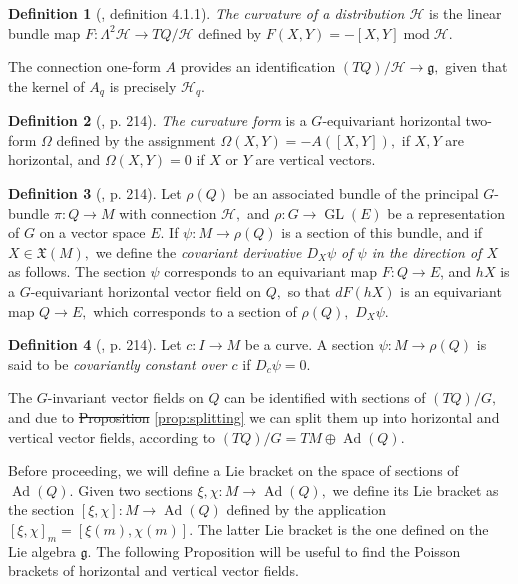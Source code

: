 \documentclass[12pt, letterpaper, reqno]{amsart}
\theoremstyle{definition}
\newtheorem{df}{Definition}
\theoremstyle{plain}
\theoremstyle{remark}
\providecommand{\DIFadd}[1]{{\protect\color{blue}\uwave{#1}}} %
\providecommand{\DIFdel}[1]{{\protect\color{red}\sout{#1}}}                      %
\providecommand{\DIFaddbegin}{} %
\providecommand{\DIFaddend}{} %
\providecommand{\DIFdelbegin}{} %
\providecommand{\DIFdelend}{} %
\newcommand{\DIFscaledelfig}{0.5}
\newlength{\DIFdelgraphicswidth} %
\newlength{\DIFdelgraphicsheight} %
\newcommand{\DIFaddincludegraphics}[2][]{{\color{blue}\fbox{\DIFOincludegraphics[#1]{#2}}}} %
\newcommand{\DIFdelincludegraphics}[2][]{%
\sbox{\DIFdelgraphicsbox}{\DIFOincludegraphics[#1]{#2}}%
\settoboxwidth{\DIFdelgraphicswidth}{\DIFdelgraphicsbox} %
\settoboxtotalheight{\DIFdelgraphicsheight}{\DIFdelgraphicsbox} %
\scalebox{\DIFscaledelfig}{%
\parbox[b]{\DIFdelgraphicswidth}{\usebox{\DIFdelgraphicsbox}\\[-\baselineskip] \rule{\DIFdelgraphicswidth}{0em}}\llap{\resizebox{\DIFdelgraphicswidth}{\DIFdelgraphicsheight}{%
\setlength{\unitlength}{\DIFdelgraphicswidth}%
\begin{picture}(1,1)%
\thicklines\linethickness{2pt} %
{\color[rgb]{1,0,0}\put(0,0){\framebox(1,1){}}}%
{\color[rgb]{1,0,0}\put(0,0){\line( 1,1){1}}}%
{\color[rgb]{1,0,0}\put(0,1){\line(1,-1){1}}}%
\end{picture}%
}\hspace*{3pt}}} %
} %
\DeclareRobustCommand{\DIFaddbegin}{\DIFOaddbegin \let\includegraphics\DIFaddincludegraphics} %
\DeclareRobustCommand{\DIFaddend}{\DIFOaddend \let\includegraphics\DIFOincludegraphics} %
\DeclareRobustCommand{\DIFdelbegin}{\DIFOdelbegin \let\includegraphics\DIFdelincludegraphics} %
\DeclareRobustCommand{\DIFdelend}{\DIFOaddend \let\includegraphics\DIFOincludegraphics} %
\begin{document}
\begin{df}[\cite{montgomery2002tour}, definition 4.1.1]
	\textit{The curvature of a distribution $ \mathcal{H} $ } is the linear bundle map $ F: \Lambda^2 \mathcal{H} \rightarrow TQ/\mathcal{H} $ defined by $ F(X,Y) = -[X,Y] \operatorname{mod} \mathcal{H}.  $ 	
\end{df}
The connection one-form $ A $ provides an identification $ (TQ)/ \mathcal{H} \rightarrow \mathfrak{g}, $ given that the kernel of $ A_q $ is precisely $ \mathcal{H}_q. $ 

\begin{df}[\cite{montgomery2002tour}, p. 214]
	\textit{The curvature form} is a $ G $-equivariant horizontal two-form $ \Omega $ defined by the assignment $ \Omega(X,Y) = -A([X,Y]), $ if $ X,Y $ are horizontal, and $ \Omega(X,Y)=0 $ if $ X $ or $ Y$ are vertical vectors.  
\end{df}

\begin{df}[\cite{montgomery2002tour}, p. 214]
	Let $ \rho(Q) $ be an associated bundle of the principal $ G $-bundle $ \pi: Q \rightarrow M $ with connection $ \mathcal{H}, $  and $ \rho:  G \rightarrow \operatorname{GL}(E) $ be a representation of $ G $ on a vector space $ E. $  If $ \psi: M \rightarrow \rho(Q) $ is a section of this bundle, and if $ X\in \mathfrak{X}(M), $ we define the \textit{covariant derivative $ D_X\psi $ of $ \psi $ in the direction of $ X $} as follows. The section $ \psi $ corresponds to an equivariant map $ F: Q \rightarrow E $, and $ hX $ is a $ G $-equivariant horizontal vector field on $ Q, $ so that $ dF(hX) $ is an equivariant map $ Q \rightarrow E, $ which corresponds to a section of $ \rho(Q), $ $ D_X\psi. $ 
\end{df}
\begin{df}[\cite{montgomery2002tour}, p. 214]\label{df:covariantly_constant}
	Let $ c:I \rightarrow M $ be a curve. A section $ \psi: M\rightarrow \rho(Q) $ is said to be \textit{covariantly constant over $ c $} if $ D_{\dot{c}}\psi=0. $  	
\end{df}
The $ G $-invariant vector fields on $ Q $ can be identified with sections of $ (TQ)/G, $ and due to \DIFdelbegin \DIFdel{Proposition }\DIFdelend \DIFaddbegin \DIFadd{proposition }\DIFaddend \ref{prop:splitting} we can split them up into horizontal and vertical vector fields, according to $ (TQ)/G = TM \oplus \operatorname{Ad} (Q). $ 

Before proceeding, we will define a Lie bracket on the space of sections of $ \operatorname{Ad} (Q).$ Given two sections $ \xi,\chi: M \rightarrow \operatorname{Ad} (Q), $ we define its Lie bracket as the section $[\xi, \chi] : M \rightarrow \operatorname{Ad} (Q)$ defined by the application $ [\xi, \chi]_m= [\xi(m), \chi(m)]. $ The latter Lie bracket is the one defined on the Lie algebra $ \mathfrak{g}. $   The following Proposition will be useful to find the Poisson brackets of horizontal and vertical vector fields.
\end{document}
